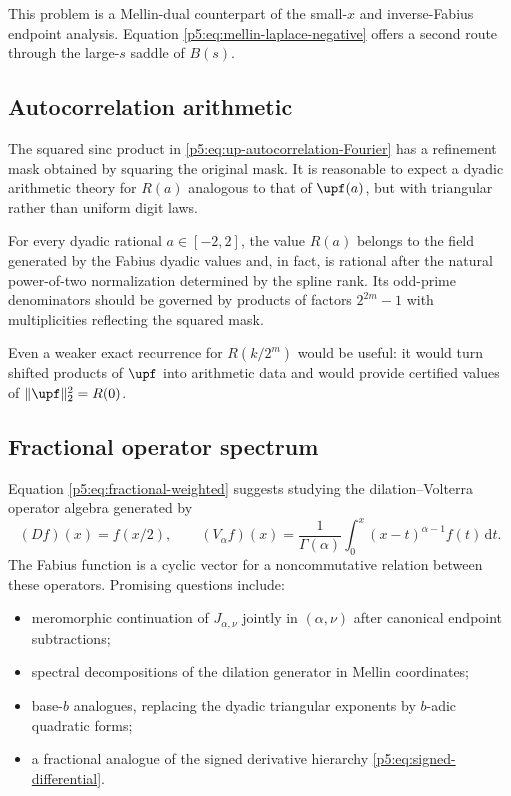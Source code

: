 \documentclass[11pt,oneside]{article}
\theoremstyle{definition}
\theoremstyle{remark}
\newcommand{\dd}{\,\mathrm d}
\newcommand{\1}{\mathbf 1}
\begin{document}
This problem is a Mellin-dual counterpart of the small-$x$ and inverse-Fabius endpoint analysis.  Equation \eqref{p5:eq:mellin-laplace-negative} offers a second route through the large-$s$ saddle of $B(s)$.

\subsection{Autocorrelation arithmetic}

The squared sinc product in \eqref{p5:eq:up-autocorrelation-Fourier} has a refinement mask obtained by squaring the original mask.  It is reasonable to expect a dyadic arithmetic theory for $R(a)$ analogous to that of $\upf(a)$, but with triangular rather than uniform digit laws.

\begin{conjecture}\label{p5:conj:autocorrelation-rational}
For every dyadic rational $a\in[-2,2]$, the value $R(a)$ belongs to the field generated by the Fabius dyadic values and, in fact, is rational after the natural power-of-two normalization determined by the spline rank.  Its odd-prime denominators should be governed by products of factors $2^{2m}-1$ with multiplicities reflecting the squared mask.
\end{conjecture}

Even a weaker exact recurrence for $R(k/2^m)$ would be useful: it would turn shifted products of $\upf$ into arithmetic data and would provide certified values of $\|\upf\|_2^2=R(0)$.

\subsection{Fractional operator spectrum}

Equation \eqref{p5:eq:fractional-weighted} suggests studying the dilation--Volterra operator algebra generated by
\[
 (Df)(x)=f(x/2),
 \qquad
 (V_\alpha f)(x)=\frac1{\Gamma(\alpha)}
 \int_0^x(x-t)^{\alpha-1}f(t)\dd t.
\]
The Fabius function is a cyclic vector for a noncommutative relation between these operators.  Promising questions include:
\begin{itemize}
\item meromorphic continuation of $J_{\alpha,\nu}$ jointly in $(\alpha,\nu)$ after canonical endpoint subtractions;
\item spectral decompositions of the dilation generator in Mellin coordinates;
\item base-$b$ analogues, replacing the dyadic triangular exponents by $b$-adic quadratic forms;
\item a fractional analogue of the signed derivative hierarchy \eqref{p5:eq:signed-differential}.
\end{itemize}
\end{document}
